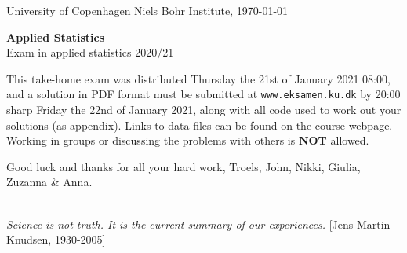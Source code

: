 \documentclass[11pt]{article}
\begin{document}

\noindent
University of Copenhagen \hfill
Niels Bohr Institute, \today \par
\vspace{-2ex}
\noindent
\hrulefill

\vspace{1ex}
\begin{center}
{\bf {\Huge Applied Statistics}}\\
\vspace{1ex}
{\large Exam in applied statistics 2020/21}
\end{center}

\vspace{0ex}
\noindent
This take-home exam was distributed Thursday the 21st of January 2021 08:00, and a solution in PDF format must be submitted at \texttt{www.eksamen.ku.dk} by 20:00 sharp Friday the 22nd of January 2021, along with all code used to work out your solutions (as appendix). Links to data files can be found on the course webpage. Working in groups or discussing the problems with others is {\bf NOT} allowed.

\vspace{1ex}
\begin{center}
  Good luck and thanks for all your hard work, Troels, John, Nikki, Giulia, Zuzanna \& Anna.
\end{center}


\noindent
\hrulefill\\
\emph{Science is not truth. It is the current summary of our experiences.} \hfill [Jens Martin Knudsen, 1930-2005]\\[-2ex]

\vspace{-2ex}
\noindent
\hrulefill
\end{document}

